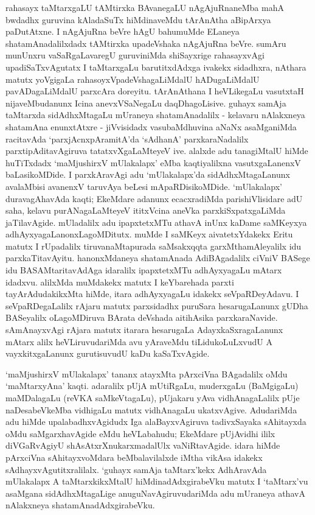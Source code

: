 rahasayx taMtarxgaLU tAMtirxka BAvanegaLU nAgAjuRnaneMba mahA bwdadhx guruvina kAladaSuTx hiMdinaveMdu tArAnAtha aBipArxya paDutAtxne. I nAgAjuRna beVre hAgU bahumuMde ELaneya shatamAnadalilxdadx tAMtirxka upadeVshaka nAgAjuRna beVre. sumAru munUnxru vaSaRgaLavaregU guruviniMda shiSayxrige rahasayxvAgi upadiSaTxvAgutatx I taMtarxgaLu barutitxdAdxga ivakekx sidadhxra, nAthara matutx yoVgigaLa rahasoyxVpadeVshagaLiMdalU hADugaLiMdalU pavADagaLiMdalU parxcAra doreyitu. tArAnAthana I heVLikegaLu vasutxtaH nijaveMbudanunx Icina anevxVSaNegaLu daqDhagoLisive. guhayx samAja taMtarxda sidAdhxMtagaLu mUraneya shatamAnadalilx - kelavaru nAlakxneya shatamAna enunxtAtxre - jiVvisidadx vasubaMdhuvina aNaNx asaMganiMda racitavAda `parxjAcnxpAramitA'da `sAdhanA' parxkaraNadalilx parxtipAditavAgiruva tatatxvXgaLaMteyeV ive. alalxde adu tanagiMtalU hiMde huTiTxdadx `maMjushirxV mUlakalapx' eMba kaqtiyalilxna vasutxgaLanenxV baLasikoMDide. I parxkAravAgi adu `mUlakalapx'da sidAdhxMtagaLanunx avalaMbisi avanenxV taruvAya beLesi mApaRDisikoMDide. `mUlakalapx' duravagAhavAda kaqti; EkeMdare adanunx ecacxradiMda parishiVlisidare adU saha, kelavu purANagaLaMteyeV ititxVcina aneVka parxkiSxpatxgaLiMda jaTilavAgide. mUladalilx adu ipapxtetxMTu athavA inUnx kaDame saMKeyxya adhAyxyagaLanonxLagoMDitutx. muMde I saMKeyx aivatetxYdakekx Eritu matutx I rUpadalilx tiruvanaMtapurada saMsakxqqta garxMthamAleyalilx idu parxkaTitavAyitu. hanonxMdaneya shatamAnada AdiBAgadalilx ciVniV BASege idu BASAMtaritavAdAga idaralilx ipapxtetxMTu adhAyxyagaLu mAtarx idadxvu. alilxMda muMdakekx matutx I keYbarehada parxti tayArAdudakikxMta hiMde, itara adhAyxyagaLu idakekx seVpaRDeyAdavu. I seVpaRDegaLalilx rAjaru matutx parxsidadhx puruSara hesarugaLanunx gUDha BASeyalilx oLagoMDiruva BArata deVshada aitihAsika parxkaraNavide. sAmAnayxvAgi rAjara matutx itarara hesarugaLa AdayxkaSxragaLanunx mAtarx alilx heVLiruvudariMda avu yAraveMdu tiLidukoLuLxvudU A vayxkitxgaLanunx gurutisuvudU kaDu kaSaTxvAgide.

`maMjushirxV mUlakalapx' tananx atayxMta pArxciVna BAgadalilx oMdu `maMtarxyAna' kaqti. adaralilx pUjA mUtiRgaLu, muderxgaLu (BaMgigaLu) maMDalagaLu (reVKA saMkeVta\-gaLu), pUjakaru yAva vidhAnagaLalilx pUje naDesabeVkeMba vidhigaLu matutx vidhAnagaLu ukatxvAgive. AdudariMda adu hiMde upalabadhxvAgidudx Iga alaBayxvAgiruva tadivxSayaka sAhitayxda oMdu saMgarxhavAgide eMdu heVLabahudu; EkeMdare pUjAvidhi ililx diVGaRvAgiyU shAsAtxrXnukarxmadalUlx vaNiRtavAgide. idara hiMde pArxciVna sAhitayxvoMdara beMbalavilalxde iMtha vikAsa idakekx sAdhayxvAgutitxralilalx. `guhayx samAja taMtarx'kekx AdhAravAda mUlakalapx A taMtarxkikxMtalU hiMdinadAdxgirabeVku matutx I `taMtarx'vu asaMgana sidAdhxMtagaLige anuguNavAgiruvudariMda adu mUraneya athavA nAlakxneya shatamAnadAdxgirabeVku.

